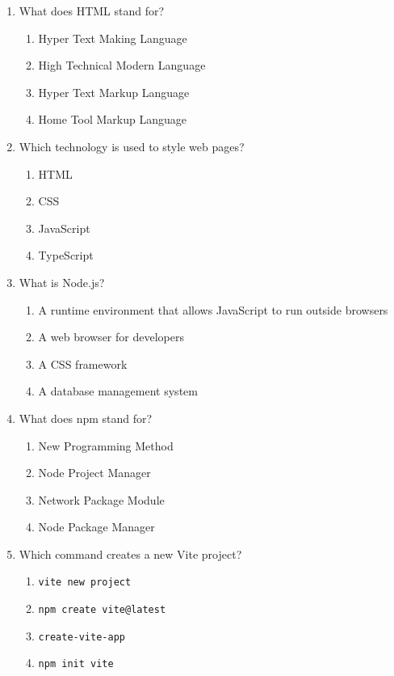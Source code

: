 \documentclass[12pt,a4paper]{article}
\begin{document}
\begin{enumerate}

\item What does HTML stand for?
\begin{enumerate}[label=\Alph*)]
    \item Hyper Text Making Language
    \item High Technical Modern Language
    \item Hyper Text Markup Language
    \item Home Tool Markup Language
\end{enumerate}

\item Which technology is used to style web pages?
\begin{enumerate}[label=\Alph*)]
    \item HTML
    \item CSS
    \item JavaScript
    \item TypeScript
\end{enumerate}

\item What is Node.js?
\begin{enumerate}[label=\Alph*)]
    \item A runtime environment that allows JavaScript to run outside browsers
    \item A web browser for developers
    \item A CSS framework
    \item A database management system
\end{enumerate}

\item What does npm stand for?
\begin{enumerate}[label=\Alph*)]
    \item New Programming Method
    \item Node Project Manager
    \item Network Package Module
    \item Node Package Manager
\end{enumerate}

\item Which command creates a new Vite project?
\begin{enumerate}[label=\Alph*)]
    \item \texttt{vite new project}
    \item \texttt{npm create vite@latest}
    \item \texttt{create-vite-app}
    \item \texttt{npm init vite}
\end{enumerate}


\end{enumerate}
\end{document}
